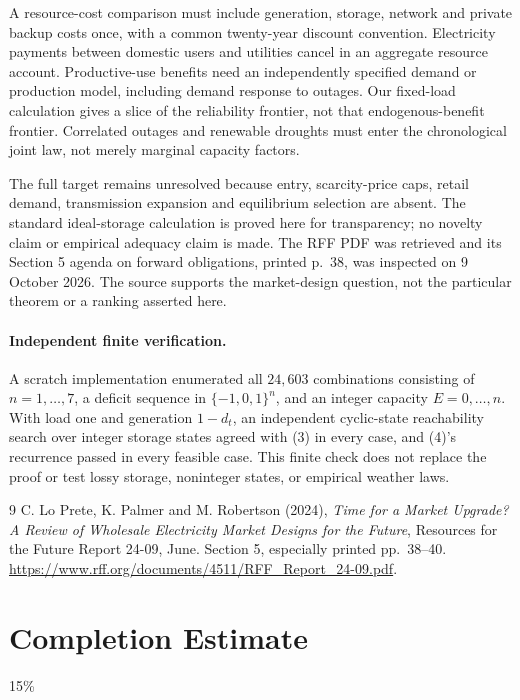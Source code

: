 \documentclass[11pt]{article}
\begin{document}
A resource-cost comparison must include generation, storage, network and
private backup costs once, with a common twenty-year discount convention.
Electricity payments between domestic users and utilities cancel in an
aggregate resource account. Productive-use benefits need an independently
specified demand or production model, including demand response to outages.
Our fixed-load calculation gives a slice of the reliability frontier, not
that endogenous-benefit frontier. Correlated outages and renewable droughts
must enter the chronological joint law, not merely marginal capacity factors.

The full target remains unresolved because entry, scarcity-price caps,
retail demand, transmission expansion and equilibrium selection are absent.
The standard ideal-storage calculation is proved here for transparency;
no novelty claim or empirical adequacy claim is made. The RFF PDF was
retrieved and its Section 5 agenda on forward obligations, printed p.~38,
was inspected on 9 October 2026. The source supports the market-design
question, not the particular theorem or a ranking asserted here.
\paragraph{Independent finite verification.}
A scratch implementation enumerated all $24{,}603$ combinations consisting
of $n=1,\ldots,7$, a deficit sequence in $\{-1,0,1\}^n$, and an integer
capacity $E=0,\ldots,n$. With load one and generation $1-d_t$, an
independent cyclic-state reachability search over integer storage states
agreed with (3) in every case, and (4)'s recurrence passed in every feasible
case. This finite check does not replace the proof or test lossy storage,
noninteger states, or empirical weather laws.

\begin{thebibliography}{9}
 C. Lo Prete, K. Palmer and M. Robertson (2024),
\emph{Time for a Market Upgrade? A Review of Wholesale Electricity Market
Designs for the Future}, Resources for the Future Report 24-09, June.
Section 5, especially printed pp.~38--40.
\url{https://www.rff.org/documents/4511/RFF_Report_24-09.pdf}.
\end{thebibliography}

\section{Completion Estimate}
15\%
\end{document}
